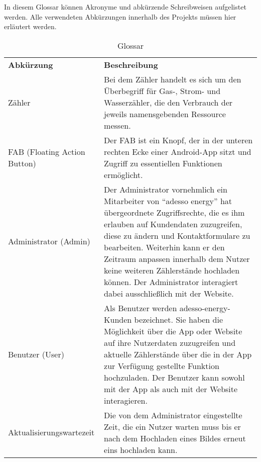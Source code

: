 \begin{tcolorbox}
	In diesem Glossar können Akronyme und abkürzende Schreibweisen aufgelistet werden. 
	Alle verwendeten Abkürzungen innerhalb des Projekts müssen hier erläutert werden.
\end{tcolorbox}

\begin{table}[h]
	\centering
	\begin{tabularx}{\textwidth}{X X}
		\rowcolor[HTML]{C0C0C0} 
		\textbf{Abkürzung} & \textbf{Beschreibung} \\
		Zähler & Bei dem Zähler handelt es sich um den Überbegriff für Gas-, Strom- und Wasserzähler, die den Verbrauch der jeweils namensgebenden Ressource messen. \\
		\rowcolor[HTML]{E7E7E7} 
		FAB (Floating Action Button) & Der FAB ist ein Knopf, der in der unteren rechten Ecke einer Android-App sitzt und Zugriff zu essentiellen Funktionen ermöglicht. \\
		Administrator (Admin) & Der Administrator vornehmlich ein Mitarbeiter von “adesso energy” hat übergeordnete Zugriffsrechte, die es ihm erlauben auf Kundendaten zuzugreifen, diese zu ändern und Kontaktformulare zu bearbeiten. Weiterhin kann er den Zeitraum anpassen innerhalb dem Nutzer keine weiteren Zählerstände hochladen können. Der Administrator interagiert dabei ausschließlich mit der Website. \\
		\rowcolor[HTML]{E7E7E7} 
		Benutzer (User) & Als Benutzer werden adesso-energy-Kunden bezeichnet. Sie haben die Möglichkeit über die App oder Website auf ihre Nutzerdaten zuzugreifen und aktuelle Zählerstände über die in der App zur Verfügung gestellte Funktion hochzuladen. Der Benutzer kann sowohl mit der App als auch mit der Website interagieren. \\
		Aktualisierungswartezeit & Die von dem Administrator eingestellte Zeit, die ein Nutzer warten muss bis er nach dem Hochladen eines Bildes erneut eins hochladen kann. 
	\end{tabularx}
	\caption{Glossar}
	\label{table:glossar}
\end{table}
